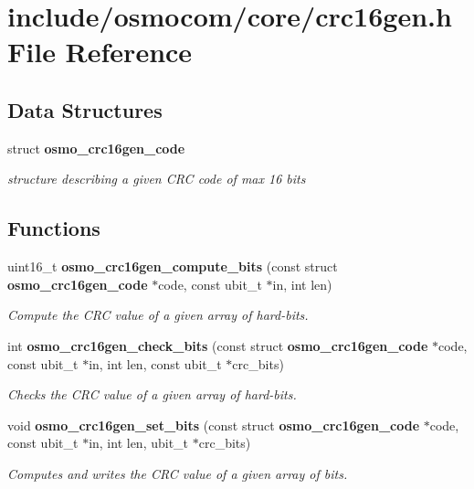 \section{include/osmocom/core/crc16gen.h File Reference}
\label{crc16gen_8h}
\subsection*{Data Structures}
\begin{DoxyCompactItemize}
\item 
struct \textbf{ osmo\+\_\+crc16gen\+\_\+code}
\begin{DoxyCompactList}\small\item\em structure describing a given C\+RC code of max 16 bits \end{DoxyCompactList}\end{DoxyCompactItemize}
\subsection*{Functions}
\begin{DoxyCompactItemize}
\item 
uint16\+\_\+t \textbf{ osmo\+\_\+crc16gen\+\_\+compute\+\_\+bits} (const struct \textbf{ osmo\+\_\+crc16gen\+\_\+code} $\ast$code, const ubit\+\_\+t $\ast$in, int len)
\begin{DoxyCompactList}\small\item\em Compute the C\+RC value of a given array of hard-\/bits. \end{DoxyCompactList}\item 
int \textbf{ osmo\+\_\+crc16gen\+\_\+check\+\_\+bits} (const struct \textbf{ osmo\+\_\+crc16gen\+\_\+code} $\ast$code, const ubit\+\_\+t $\ast$in, int len, const ubit\+\_\+t $\ast$crc\+\_\+bits)
\begin{DoxyCompactList}\small\item\em Checks the C\+RC value of a given array of hard-\/bits. \end{DoxyCompactList}\item 
void \textbf{ osmo\+\_\+crc16gen\+\_\+set\+\_\+bits} (const struct \textbf{ osmo\+\_\+crc16gen\+\_\+code} $\ast$code, const ubit\+\_\+t $\ast$in, int len, ubit\+\_\+t $\ast$crc\+\_\+bits)
\begin{DoxyCompactList}\small\item\em Computes and writes the C\+RC value of a given array of bits. \end{DoxyCompactList}\end{DoxyCompactItemize}
